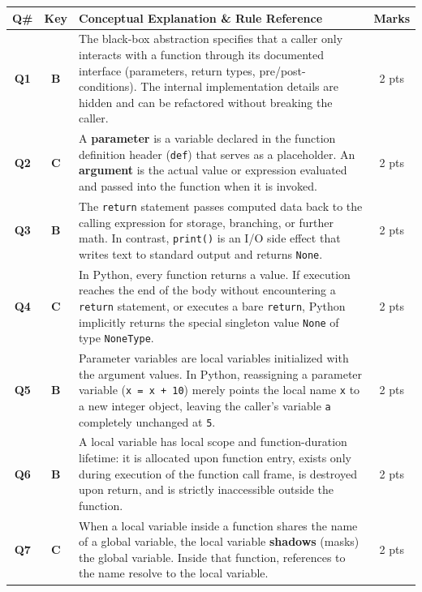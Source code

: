 \documentclass[11pt,a4paper]{article}
\begin{document}
\begin{center}
\renewcommand{\arraystretch}{1.3}
\small
\begin{tabularx}{\textwidth}{|c|c|X|c|}
\hline
\textbf{Q\#} & \textbf{Key} & \textbf{Conceptual Explanation \& Rule Reference} & \textbf{Marks} \\
\hline
\textbf{Q1} & \textbf{B} & The black-box abstraction specifies that a caller only interacts with a function through its documented interface (parameters, return types, pre/post-conditions). The internal implementation details are hidden and can be refactored without breaking the caller. & 2 pts \\
\hline
\textbf{Q2} & \textbf{C} & A \textbf{parameter} is a variable declared in the function definition header (\texttt{def}) that serves as a placeholder. An \textbf{argument} is the actual value or expression evaluated and passed into the function when it is invoked. & 2 pts \\
\hline
\textbf{Q3} & \textbf{B} & The \texttt{return} statement passes computed data back to the calling expression for storage, branching, or further math. In contrast, \texttt{print()} is an I/O side effect that writes text to standard output and returns \texttt{None}. & 2 pts \\
\hline
\textbf{Q4} & \textbf{C} & In Python, every function returns a value. If execution reaches the end of the body without encountering a \texttt{return} statement, or executes a bare \texttt{return}, Python implicitly returns the special singleton value \texttt{None} of type \texttt{NoneType}. & 2 pts \\
\hline
\textbf{Q5} & \textbf{B} & Parameter variables are local variables initialized with the argument values. In Python, reassigning a parameter variable (\texttt{x = x + 10}) merely points the local name \texttt{x} to a new integer object, leaving the caller's variable \texttt{a} completely unchanged at \texttt{5}. & 2 pts \\
\hline
\textbf{Q6} & \textbf{B} & A local variable has local scope and function-duration lifetime: it is allocated upon function entry, exists only during execution of the function call frame, is destroyed upon return, and is strictly inaccessible outside the function. & 2 pts \\
\hline
\textbf{Q7} & \textbf{C} & When a local variable inside a function shares the name of a global variable, the local variable \textbf{shadows} (masks) the global variable. Inside that function, references to the name resolve to the local variable. & 2 pts \\

\end{tabularx}
\end{center}
\end{document}
